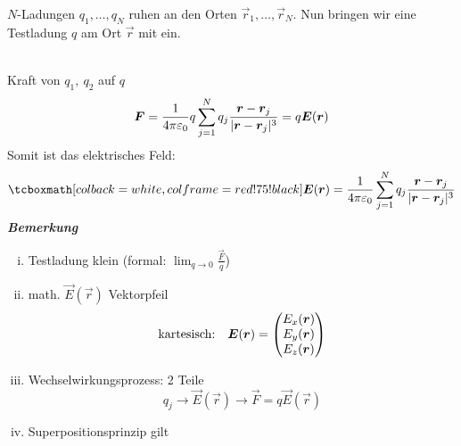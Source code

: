 \begin{minipage}{.5\linewidth}
	$N$-Ladungen $q_1, \dots, q_N$ ruhen an den Orten $\vec{r}_1, \dots, \vec{r}_N$. Nun bringen wir eine Testladung $q$ am Ort $\vec{r}$ mit ein. 
\end{minipage}%
\begin{minipage}{.5\linewidth}
	\hspace{50pt}
\end{minipage}%
\\
Kraft von $q_1,\ q_2$ auf $q$
$$\bm{F} = \frac{1}{4\pi \varepsilon_0} q \sum_{j = 1}^{N} q_j \frac{\bm{r} - \bm{r}_j}{|\bm{r} - \bm{r}_j|^3} = q \bm{E}(\bm{r})$$
Somit ist das elektrisches Feld:
$$\rmbox{\vec{E}(\vec{r}) = \frac{1}{4 \pi \epsilon_0} \summ{j = 1}{N} q_j \frac{\vec{r} - \vec{r}_j}{|\vec{r} - \vec{r}_j|^3}}$$
\textbf{\emph{Bemerkung}}
\begin{enumerate}[i)]
	\item Testladung klein (formal: $ \lim_{q\to0}\frac{\vec{F}}{q} $)
	\item math. $ \vec{E}(\vec{r}) $ Vektorpfeil\\
	\begin{equation*}
	\textrm{kartesisch:} \quad \bm{E}(\bm{r}) = \begin{pmatrix}
	E_x(\bm{r}) \\ E_y(\bm{r}) \\ E_z(\bm{r})
	\end{pmatrix}
	\end{equation*}
	\item Wechselwirkungsprozess: 2 Teile
	\begin{equation*}
	q_j \rightarrow \vec{E}(\vec{r}) \rightarrow \vec{F} = q \vec{E} (\vec{r})
	\end{equation*}
	\item Superpositionsprinzip gilt
\end{enumerate}

